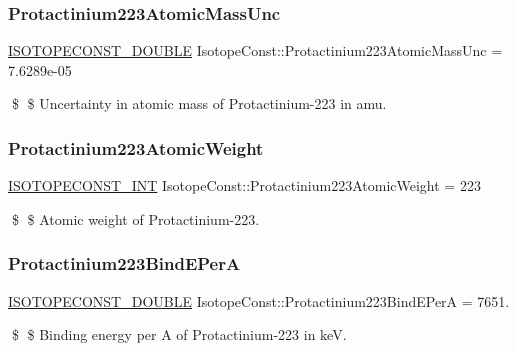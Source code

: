 \subsubsection{\texorpdfstring{Protactinium223\+Atomic\+Mass\+Unc}{Protactinium223AtomicMassUnc}}
{\footnotesize\ttfamily \mbox{\hyperlink{group___isotope_const-_macros_ga8f45a7272ce02c0b4c65c44636ed719a}{I\+S\+O\+T\+O\+P\+E\+C\+O\+N\+S\+T\+\_\+\+D\+O\+U\+B\+LE}} Isotope\+Const\+::\+Protactinium223\+Atomic\+Mass\+Unc = 7.\+6289e-\/05}

\$ \$ Uncertainty in atomic mass of Protactinium-\/223 in amu. \mbox{\label{group___isotope_const-_protactinium-_pa223_ga6891d629a863a67792c6caaaf32b9872}} 
\subsubsection{\texorpdfstring{Protactinium223\+Atomic\+Weight}{Protactinium223AtomicWeight}}
{\footnotesize\ttfamily \mbox{\hyperlink{group___isotope_const-_macros_ga5f18360b3e99483a35c32d789e62621c}{I\+S\+O\+T\+O\+P\+E\+C\+O\+N\+S\+T\+\_\+\+I\+NT}} Isotope\+Const\+::\+Protactinium223\+Atomic\+Weight = 223}

\$ \$ Atomic weight of Protactinium-\/223. \mbox{\label{group___isotope_const-_protactinium-_pa223_ga54775688191961d78402e9f47839e344}} 
\subsubsection{\texorpdfstring{Protactinium223\+Bind\+E\+PerA}{Protactinium223BindEPerA}}
{\footnotesize\ttfamily \mbox{\hyperlink{group___isotope_const-_macros_ga8f45a7272ce02c0b4c65c44636ed719a}{I\+S\+O\+T\+O\+P\+E\+C\+O\+N\+S\+T\+\_\+\+D\+O\+U\+B\+LE}} Isotope\+Const\+::\+Protactinium223\+Bind\+E\+PerA = 7651.}

\$ \$ Binding energy per A of Protactinium-\/223 in keV. \mbox{\label{group___isotope_const-_protactinium-_pa223_ga0675dcde5e9e13ca0b9f39bb0fce1aba}} 
